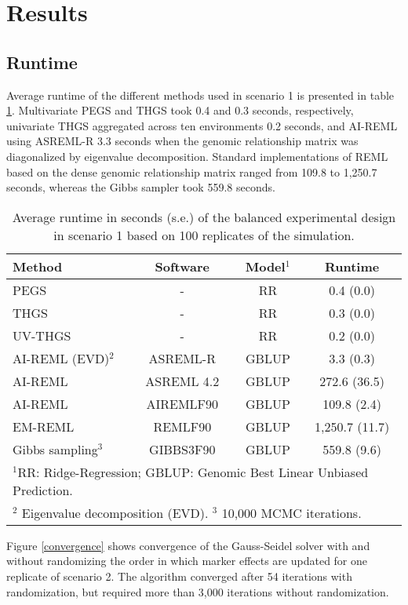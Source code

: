 \documentclass{bmcart}
\begin{document}
\section{Results}

\subsection{Runtime}

Average runtime of the different methods used in scenario 1 is presented in table \ref{RUNTIME1}. Multivariate PEGS and THGS took 0.4 and 0.3 seconds, respectively, univariate THGS aggregated across ten environments 0.2 seconds, and AI-REML using ASREML-R 3.3 seconds when the genomic relationship matrix was diagonalized by  eigenvalue decomposition. Standard implementations of REML based on the dense genomic relationship matrix ranged from 109.8 to 1,250.7 seconds, whereas the Gibbs sampler took 559.8 seconds.

\begin{table}[ht]
\centering
\renewcommand*{\arraystretch}{1.2}
\caption{Average runtime in seconds (s.e.) of the balanced experimental design in scenario 1 based on 100 replicates of the simulation.}\smallskip
\begin{tabular}{l c c c}
\hline
Method & Software & Model$^1$ & Runtime \\
\hline
PEGS & - & RR & 0.4 (0.0) \\
THGS & - & RR & 0.3 (0.0) \\
UV-THGS & - & RR & 0.2 (0.0) \\
AI-REML (EVD)$^2$ & ASREML-R & GBLUP & 3.3 (0.3) \\
AI-REML & ASREML 4.2 & GBLUP & 272.6 (36.5) \\
AI-REML & AIREMLF90 & GBLUP & 109.8 (2.4) \\
EM-REML & REMLF90 & GBLUP & 1,250.7 (11.7) \\
Gibbs sampling$^3$ & GIBBS3F90 & GBLUP & 559.8 (9.6) \\
\hline
\multicolumn{4}{l}{\small{$^1$RR: Ridge-Regression; GBLUP: Genomic Best Linear Unbiased Prediction.}} \\
\multicolumn{4}{l}{\small{$^2$ Eigenvalue decomposition (EVD). $^3$ 10,000 MCMC iterations.}}
\end{tabular}
\label{RUNTIME1}
\end{table}

Figure \ref{convergence} shows convergence of the Gauss-Seidel solver with and without  randomizing the order in which marker effects are updated for one replicate of scenario 2. The algorithm converged after 54 iterations with randomization, but required more than 3,000 iterations without randomization.
\end{document}
